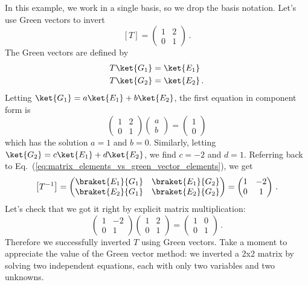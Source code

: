 In this example, we work in a single basis, so we drop the basis notation.
Let's use Green vectors to invert
\begin{equation}
  \left[ T \right] =
  \begin{pmatrix}
    1 & 2 \\ 0 & 1
  \end{pmatrix}
  \, .
\end{equation}
The Green vectors are defined by
\begin{align*}
  T \ket{G_1} &= \ket{E_1} \\
  T \ket{G_2} &= \ket{E_2}
  \, .
\end{align*}
Letting $\ket{G_1} = a \ket{E_1} + b \ket{E_2}$, the first equation in component form is
\begin{equation}
  \begin{pmatrix} 1 & 2 \\ 0 & 1 \end{pmatrix} \begin{pmatrix} a \\ b \end{pmatrix}
    = \begin{pmatrix} 1 \\ 0 \end{pmatrix}
\end{equation}
which has the solution $a=1$ and $b=0$.
Similarly, letting $\ket{G_2} = c \ket{E_1} + d \ket{E_2}$, we find $c=-2$ and $d=1$.
Referring back to Eq.~(\ref{eq:matrix_elements_vs_green_vector_elements}), we get
\begin{equation}
  \left[ T ^{-1} \right]
  = \begin{pmatrix}
    \braket{E_1}{G_1} & \braket{E_1}{G_2} \\ \braket{E_2}{G_1} & \braket{E_2}{G_2}
  \end{pmatrix}
  = \begin{pmatrix}
    1 & -2 \\ 0 & 1
  \end{pmatrix}
  \, .
\end{equation}
Let's check that we got it right by explicit matrix multiplication:
\begin{equation}
  \begin{pmatrix} 1 & -2 \\ 0 & 1 \end{pmatrix}
  \begin{pmatrix} 1 & 2 \\ 0 & 1 \end{pmatrix}
  = \begin{pmatrix} 1 & 0 \\ 0 & 1 \end{pmatrix}
  \, .
\end{equation}
Therefore we successfully inverted $T$ using Green vectors.
Take a moment to appreciate the value of the Green vector method: we inverted a 2x2 matrix by solving two independent equations, each with only two variables and two unknowns.

